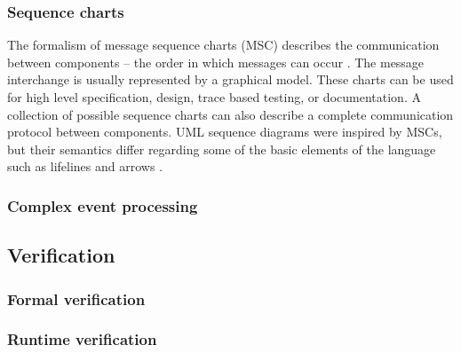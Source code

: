     \subsubsection{Sequence charts}
The formalism of message sequence charts (MSC) describes the communication between components -- the order in which messages can occur \cite{msc} \cite{msc2}. The message interchange is usually represented by a graphical model. These charts can be used for high level specification, design, trace based testing, or documentation. A collection of possible sequence charts can also describe a complete communication protocol between components. UML sequence diagrams were inspired by MSCs, but their semantics differ regarding some of the basic elements of the language such as lifelines and arrows \cite{mscuml}.
    \subsubsection{Complex event processing}

  \subsection{Verification}
    \subsubsection{Formal verification}
    \subsubsection{Runtime verification}

%